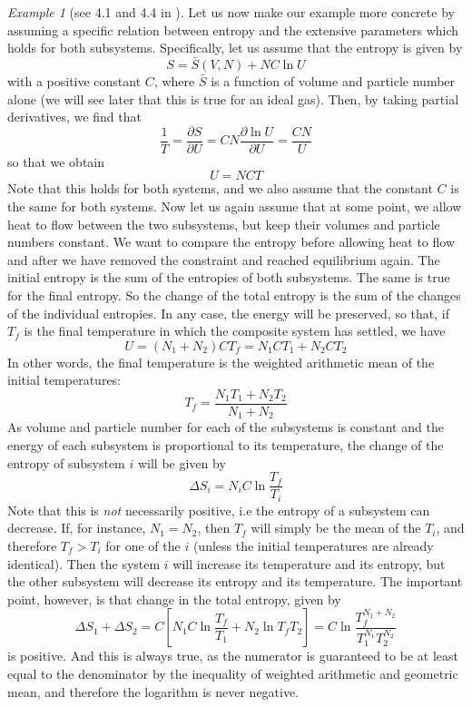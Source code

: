 \documentclass[a4paper, draft]{article}
\theoremstyle{own}
\theoremstyle{remark}
\newtheorem{example}{Example}[section]
\begin{document}
\begin{example}[see 4.1 and 4.4 in \cite{Callen}]\label{ex:idealgascomposite}
Let us now make our example more concrete by assuming a specific relation between entropy and the extensive parameters which holds for both subsystems. Specifically, let us assume that the entropy is given by
$$
S = \bar{S}(V,N) + N C \ln U
$$
with a positive constant $C$, where $\bar{S}$ is a function of volume and particle number alone (we will see later that this is true for an ideal gas). Then, by taking partial derivatives, we find that
$$
\frac{1}{T} = \frac{\partial S}{\partial U} = CN \frac{\partial \ln U}{\partial U} = \frac{CN}{U}
$$
so that we obtain
$$
U = NCT
$$
Note that this holds for both systems, and we also assume that the constant $C$ is the same for both systems. Now let us again assume that at some point, we allow heat to flow between the two subsystems, but keep their volumes and particle numbers constant. We want to compare the entropy before allowing heat to flow and after we have removed the constraint and reached equilibrium again. The initial entropy is the sum of the entropies of both subsystems. The same is true for the final entropy. So the change of the total entropy is the sum of the changes of the individual entropies. In any case, the energy will be preserved, so that, if $T_f$ is the final temperature in which the composite system has settled, we have
$$
U = (N_1 + N_2) C T_f = N_1 C T_1 + N_2 C T_2
$$
In other words, the final temperature is the weighted arithmetic mean of the initial temperatures:
$$
T_f = \frac{N_1 T_1 + N_2 T_2}{N_1 + N_2}
$$
As volume and particle number for each of the subsystems is constant and the energy of each subsystem is proportional to its temperature, the change of the entropy of subsystem $i$ will be given by
$$
\Delta S_i = N_i C \ln \frac{T_f}{T_i}
$$
Note that this is {\em not} necessarily positive, i.e the entropy of a subsystem can decrease. If, for instance, $N_1 = N_2$, then $T_f$ will simply be the mean of the $T_i$, and therefore $T_f > T_i$ for one of the $i$ (unless the initial temperatures are already identical). Then the system $i$ will increase its temperature and its entropy, but the other subsystem will decrease its entropy and its temperature. The important point, however, is that change in the total entropy, given by
$$
\Delta S_1 + \Delta S_2 = C [N_1 C\ln \frac{T_f}{T_1} + N_2 \ln {T_f}{T_2}] 
= C \ln \frac{T_f^{N_1 + N_2}}{T_1^{N_1} T_2^{N_2}}
$$
is positive. And this is always true, as the numerator is guaranteed to be at least equal to the denominator by the inequality of weighted arithmetic and geometric mean, and therefore the logarithm is never negative.
\end{example}
\end{document}
